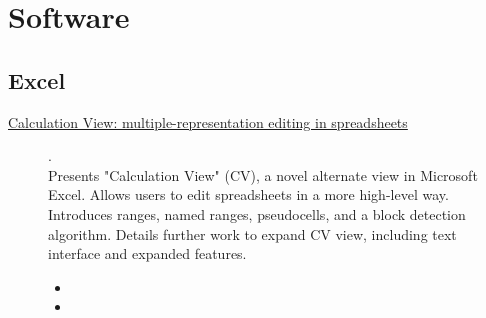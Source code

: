 \chapter {Software}

\section{Excel}

\begin{description}
  \item[\href{https://advait.org/files/sarkar_2018_calcview.pdf}{Calculation View: multiple-representation editing in spreadsheets}] {\cite{sarkar2018calculation}.
    \\ Presents "Calculation View" (CV), a novel alternate view in Microsoft Excel. Allows users to edit spreadsheets in a more high-level way. Introduces ranges, named ranges, pseudocells, and a block detection algorithm. Details further work to expand CV view, including text interface and expanded features.
    \begin{itemize}
      \item {}
      \item {}
    \end{itemize}}
\end{description}